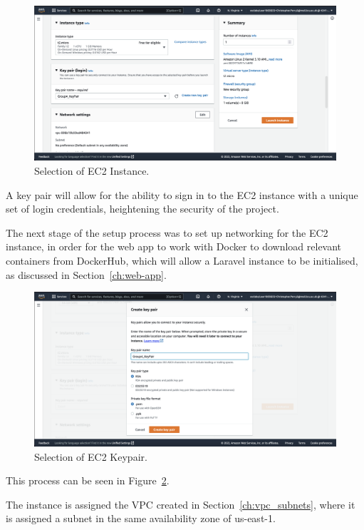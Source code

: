 \begin{figure}[!htbp]
    \centering
    \includegraphics[scale=0.3]{resources/ec2/create-instance-instance-type}
    \caption{Selection of EC2 Instance.}
    \label{fig:ec2-instance}
\end{figure}

A key pair will allow for the ability to sign in to the EC2 instance with a unique set of login credentials, heightening
the security of the project.

The next stage of the setup process was to set up networking for the EC2 instance, in order for the web app to work with
Docker to download relevant containers from DockerHub, which will allow a Laravel instance to be initialised, as
discussed in Section~\ref{ch:web-app}.

\begin{figure}[!htbp]
    \centering
    \includegraphics[scale=0.3]{resources/ec2/create-key-pair}
    \caption{Selection of EC2 Keypair.}
    \label{fig:ec2-keypair}
\end{figure}

This process can be seen in Figure~\ref{fig:ec2-keypair}.

The instance is assigned the VPC created in Section~\ref{ch:vpc_subnets}, where it is assigned a subnet in the same
availability zone of us-east-1.


